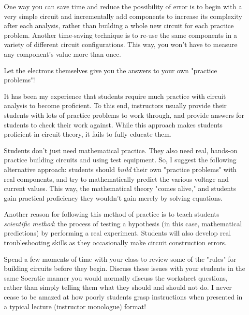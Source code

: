 One way you can save time and reduce the possibility of error is to begin with a very simple circuit and incrementally add components to increase its complexity after each analysis, rather than building a whole new circuit for each practice problem.  Another time-saving technique is to re-use the same components in a variety of different circuit configurations.  This way, you won't have to measure any component's value more than once.







Let the electrons themselves give you the answers to your own "practice problems"!







It has been my experience that students require much practice with circuit analysis to become proficient.  To this end, instructors usually provide their students with lots of practice problems to work through, and provide answers for students to check their work against.  While this approach makes students proficient in circuit theory, it fails to fully educate them.

Students don't just need mathematical practice.  They also need real, hands-on practice building circuits and using test equipment.  So, I suggest the following alternative approach: students should {\it build} their own "practice problems" with real components, and try to mathematically predict the various voltage and current values.  This way, the mathematical theory "comes alive," and students gain practical proficiency they wouldn't gain merely by solving equations.

Another reason for following this method of practice is to teach students {\it scientific method}: the process of testing a hypothesis (in this case, mathematical predictions) by performing a real experiment.  Students will also develop real troubleshooting skills as they occasionally make circuit construction errors.

Spend a few moments of time with your class to review some of the "rules" for building circuits before they begin.  Discuss these issues with your students in the same Socratic manner you would normally discuss the worksheet questions, rather than simply telling them what they should and should not do.  I never cease to be amazed at how poorly students grasp instructions when presented in a typical lecture (instructor monologue) format!

